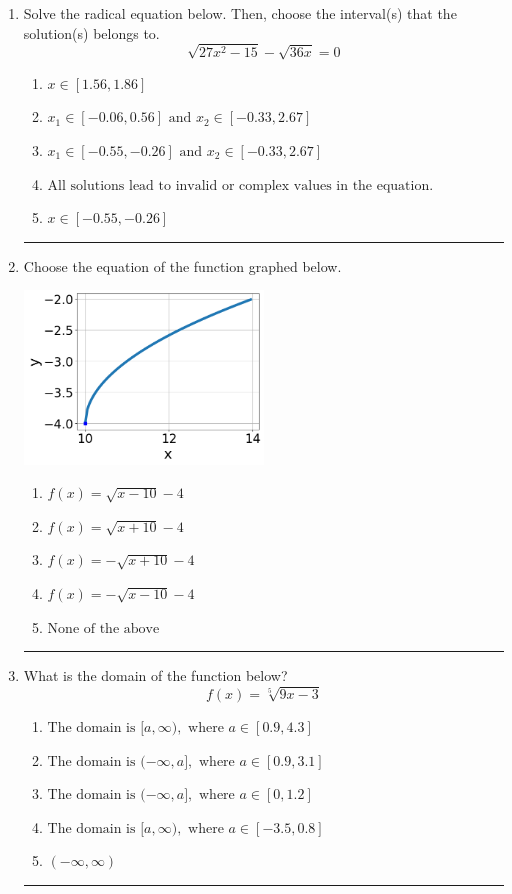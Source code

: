 \documentclass[14pt]{extbook}
\newcommand{\litem}[1]{\item#1\hspace*{-1cm}\rule{\textwidth}{0.4pt}}
\begin{document}
\begin{enumerate}
{\begin{enumerate}[label=\Alph*.]
\end{enumerate} }
\litem{
Solve the radical equation below. Then, choose the interval(s) that the solution(s) belongs to.\[ \sqrt{27 x^2 - 15} - \sqrt{36 x} = 0 \]\begin{enumerate}[label=\Alph*.]
\item \( x \in [1.56,1.86] \)
\item \( x_1 \in [-0.06, 0.56] \text{ and } x_2 \in [-0.33,2.67] \)
\item \( x_1 \in [-0.55, -0.26] \text{ and } x_2 \in [-0.33,2.67] \)
\item \( \text{All solutions lead to invalid or complex values in the equation.} \)
\item \( x \in [-0.55,-0.26] \)

\end{enumerate} }
\litem{
Choose the equation of the function graphed below.
\begin{center}
    \includegraphics[width=0.5\textwidth]{../Figures/radicalGraphToEquationCopyC.png}
\end{center}
\begin{enumerate}[label=\Alph*.]
\item \( f(x) = \sqrt{x - 10} - 4 \)
\item \( f(x) = \sqrt{x + 10} - 4 \)
\item \( f(x) = - \sqrt{x + 10} - 4 \)
\item \( f(x) = - \sqrt{x - 10} - 4 \)
\item \( \text{None of the above} \)

\end{enumerate} }
\litem{
What is the domain of the function below?\[ f(x) = \sqrt[5]{9 x - 3} \]\begin{enumerate}[label=\Alph*.]
\item \( \text{The domain is } [a, \infty), \text{   where } a \in [0.9, 4.3] \)
\item \( \text{The domain is } (-\infty, a], \text{   where } a \in [0.9, 3.1] \)
\item \( \text{The domain is } (-\infty, a], \text{   where } a \in [0, 1.2] \)
\item \( \text{The domain is } [a, \infty), \text{   where } a \in [-3.5, 0.8] \)
\item \( (-\infty, \infty) \)


\end{enumerate}}
\end{enumerate}
\end{document}
